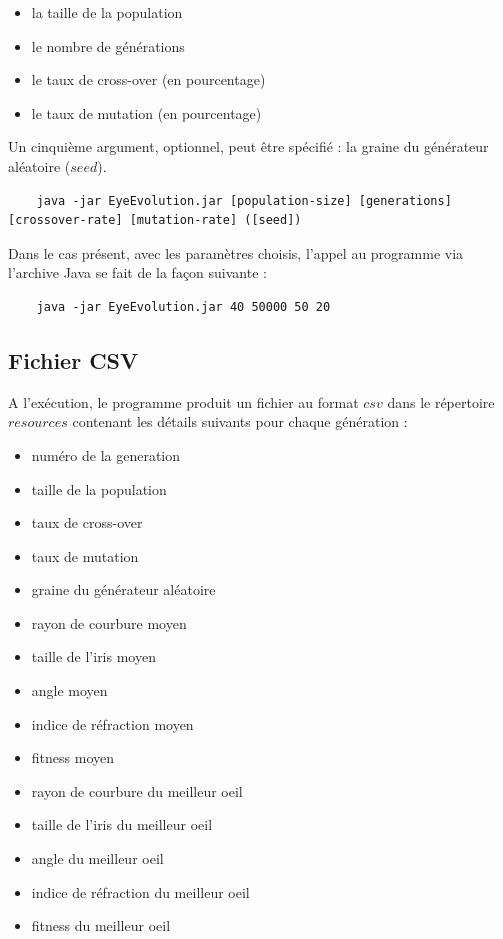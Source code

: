 \documentclass[a4paper,11pt]{article}
\begin{document}
\begin{itemize}
\item la taille de la population
\item le nombre de générations
\item le taux de cross-over (en pourcentage)
\item le taux de mutation (en pourcentage)
\end{itemize}

Un cinquième argument, optionnel, peut être spécifié : la graine du générateur aléatoire ($seed$).

\begin{lstlisting}
	java -jar EyeEvolution.jar [population-size] [generations] [crossover-rate] [mutation-rate] ([seed])
\end{lstlisting}

Dans le cas présent, avec les paramètres choisis, l'appel au programme via l'archive Java se fait de la façon suivante : 

\begin{lstlisting}
	java -jar EyeEvolution.jar 40 50000 50 20
\end{lstlisting}
	
\subsection{Fichier CSV}

A l'exécution, le programme produit un fichier au format $csv$ dans le répertoire $resources$ contenant les détails suivants pour chaque génération :
\begin{itemize}
\item numéro de la generation
\item taille de la population
\item taux de cross-over
\item taux de mutation
\item graine du générateur aléatoire
\item rayon de courbure moyen
\item taille de l'iris moyen
\item angle moyen
\item indice de réfraction moyen
\item fitness moyen
\item rayon de courbure du meilleur oeil
\item taille de l'iris du meilleur oeil
\item angle du meilleur oeil
\item indice de réfraction du meilleur oeil
\item fitness du meilleur oeil
\end{itemize}
\end{document}

